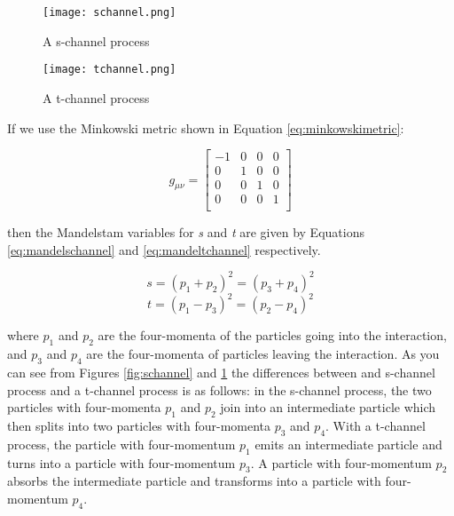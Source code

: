 \documentclass[11pt,oneside,a4paper]{article}
\begin{document}
\begin{figure}
	\centering
	\begin{minipage}{.5\textwidth}
		\centering
		\texttt{[image: schannel.png]}
		\caption{A s-channel process}
		\label{fig:schannel}
	\end{minipage}%
	\begin{minipage}{.5\textwidth}
		\centering
		\texttt{[image: tchannel.png]}
		\caption{A t-channel process}
		\label{fig:tchannel}
	\end{minipage}
\end{figure}


If we use the Minkowski metric shown in Equation \ref{eq:minkowskimetric}:


\begin{equation}
\label{eq:minkowskimetric}
g_{\mu\nu} = \begin{bmatrix}
-1 & 0 & 0 & 0 \\
0 & 1 & 0 & 0 \\
0 & 0 & 1 & 0 \\
0 & 0 & 0 & 1 \\
\end{bmatrix}
\end{equation}

then the Mandelstam variables for \textit{s} and \textit{t} are given by Equations \ref{eq:mandelschannel} and \ref{eq:mandeltchannel} respectively.

\begin{equation}
\label{eq:mandelschannel}
s=(p_1 + p_2)^2 = (p_3 + p_4)^2
\end{equation}
\begin{equation}
\label{eq:mandeltchannel}
t=(p_1 - p_3)^2 = (p_2 - p_4)^2
\end{equation}


where \textit{$p_1$} and \textit{$p_2$} are the four-momenta of the particles going into the interaction, and \textit{$p_3$} and \textit{$p_4$} are the four-momenta of particles leaving the interaction. As you can see from Figures \ref{fig:schannel} and \ref{fig:tchannel} the differences between and s-channel process and a t-channel process is as follows: in the s-channel process, the two particles with four-momenta \textit{$p_1$} and \textit{$p_2$} join into an intermediate particle which then splits into two particles with four-momenta \textit{$p_3$} and \textit{$p_4$}. With a t-channel process, the particle with four-momentum \textit{$p_1$} emits an intermediate particle and turns into a particle with four-momentum \textit{$p_3$}. A particle with four-momentum \textit{$p_2$} absorbs the intermediate particle and transforms into a particle with four-momentum \textit{$p_4$}.
\end{document}
